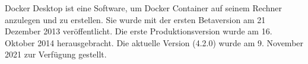 
Docker Desktop ist eine Software, um Docker Container auf seinem Rechner anzulegen und zu erstellen. Sie wurde mit der ersten Betaversion am 21 Dezember 2013 veröffentlicht. Die erste Produktionsversion wurde am 16. Oktober 2014 herausgebracht. Die aktuelle Version (4.2.0) wurde am 9. November 2021 zur Verfügung gestellt. \cite{DockerWiki}
